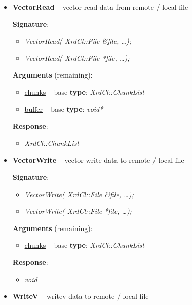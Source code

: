 \documentclass{article}
\begin{document}
\begin{itemize}
				  \item \textbf{VectorRead} -- vector-read data from remote / local file
				  
				  	\textbf{Signature}:
				  	\begin{itemize} 
			          \item \textit{VectorRead( XrdCl::File \&file, \ldots);}
			          \item \textit{VectorRead( XrdCl::File *file, \ldots );}
			        \end{itemize}
			        
			        \textbf{Arguments} (remaining):
					\begin{itemize}
					  \item \underline{chunks} -- base \textbf{type}: \textit{XrdCl::ChunkList}
					  \item \underline{buffer} -- base \textbf{type}: \textit{void*}
				    \end{itemize}
				    
					\textbf{Response}:
					\begin{itemize}
					  \item \textit{XrdCl::ChunkList}
					\end{itemize}
					
				  \item \textbf{VectorWrite} -- vector-write data to remote / local file
				  
				  	\textbf{Signature}:
				  	\begin{itemize} 
			          \item \textit{VectorWrite( XrdCl::File \&file, \ldots);}
			          \item \textit{VectorWrite( XrdCl::File *file, \ldots );}
			        \end{itemize}
			        
			        \textbf{Arguments} (remaining):
					\begin{itemize}
					  \item \underline{chunks} -- base \textbf{type}: \textit{XrdCl::ChunkList}
				    \end{itemize}
				    
					\textbf{Response}:
					\begin{itemize}
					  \item \textit{void}
					\end{itemize}
					
				  \item \textbf{WriteV} -- writev data to remote / local file
				  

\end{itemize}
\end{document}
